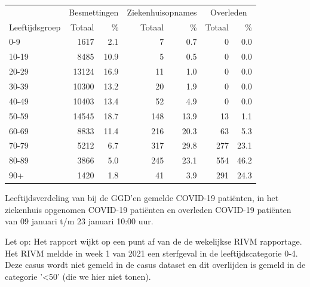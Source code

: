 \documentclass[
  english,
  man,floatsintext]{apa6}
\begin{document}
\begin{table}[H]
\centering\begingroup\fontsize{11}{13}\selectfont

\begin{threeparttable}
\begin{tabular}{lrrrrrr}
\toprule
\multicolumn{1}{c}{ } & \multicolumn{2}{c}{Besmettingen} & \multicolumn{2}{c}{Ziekenhuisopnames} & \multicolumn{2}{c}{Overleden} \\
\cmidrule(l{3pt}r{3pt}){2-3} \cmidrule(l{3pt}r{3pt}){4-5} \cmidrule(l{3pt}r{3pt}){6-7}
Leeftijdsgroep & Totaal & \% & Totaal & \% & Totaal & \%\\
\midrule
0-9 & 1617 & 2.1 & 7 & 0.7 & 0 & 0.0\\
10-19 & 8485 & 10.9 & 5 & 0.5 & 0 & 0.0\\
20-29 & 13124 & 16.9 & 11 & 1.0 & 0 & 0.0\\
30-39 & 10300 & 13.2 & 20 & 1.9 & 0 & 0.0\\
40-49 & 10403 & 13.4 & 52 & 4.9 & 0 & 0.0\\
50-59 & 14545 & 18.7 & 148 & 13.9 & 13 & 1.1\\
60-69 & 8833 & 11.4 & 216 & 20.3 & 63 & 5.3\\
70-79 & 5212 & 6.7 & 317 & 29.8 & 277 & 23.1\\
80-89 & 3866 & 5.0 & 245 & 23.1 & 554 & 46.2\\
90+ & 1420 & 1.8 & 41 & 3.9 & 291 & 24.3\\
\bottomrule
\end{tabular}
\begin{tablenotes}
\item[1] Leeftijdsverdeling van bij de GGD’en gemelde COVID-19 patiënten, in het ziekenhuis opgenomen COVID-19 patiënten en overleden COVID-19 patiënten van 09 januari t/m 23 januari 10:00 uur.
\item[2] Let op: Het rapport wijkt op een punt af van de de wekelijkse RIVM rapportage. Het RIVM meldde in week 1 van 2021 een sterfgeval in de leeftijdscategorie 0-4. Deze casus wordt niet gemeld in de casus dataset en dit overlijden is gemeld in de categorie '<50' (die we hier niet tonen).
\end{tablenotes}
\end{threeparttable}
\endgroup{}
\end{table}

\newpage
\end{document}
